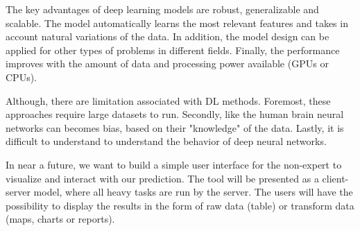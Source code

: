 \documentclass[12pt]{article}
\begin{document}
The key advantages of deep learning models are robust, generalizable and scalable. The model automatically learns the most relevant features and takes in account natural variations of the data. In addition, the model design can be applied for other types of problems in different fields. Finally, the performance improves with the amount of data\autocite{LeCun2015} and processing power available (GPUs or CPUs).

Although, there are limitation associated with DL methods. Foremost, these approaches require large datasets to run. Secondly, like the human brain neural networks can becomes bias, based on their "knowledge" of the data. Lastly, it is difficult to understand to understand the behavior of deep neural networks\autocite{Miotto2017}.

In near a future, we want to build a simple user interface for the non-expert to visualize and interact with our prediction. The tool will be presented as a client-server model, where all heavy tasks are run by the server. The users will have the possibility to display the results in the form of raw data (table) or transform data (maps, charts or reports).

\printbibliography[title={Bibliography},nottype=misc,resetnumbers=true]
\end{document}
